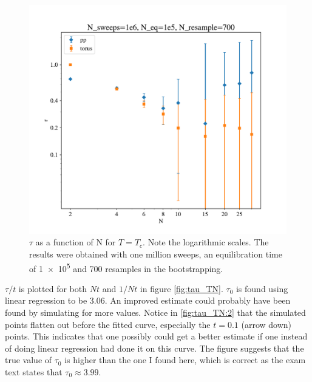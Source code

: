 \documentclass[12pt, a4paper]{article}
\begin{document}
\begin{figure}[H]
  \centering
  \includegraphics[width=.75\textwidth]{media/tau_N}
  \caption{$\tau$ as a function of N for $T=T_c$.
    Note the logarithmic scales.
    The results were obtained with one million sweeps, an equilibration time of \num{1e5} and 700 resamples in the bootstrapping.
    \label{fig:tau_N}}
\end{figure}

$\tau/t$ is plotted for both $Nt$ and $1/Nt$ in figure \ref{fig:tau_TN}.
$\tau_0$ is found using linear regression to be 3.06.
An improved estimate could probably have been found by simulating for more values.
Notice in \ref{fig:tau_TN:2} that the simulated points flatten out before the fitted curve, especially the $t=0.1$ (arrow down) points.
This indicates that one possibly could get a better estimate if one instead of doing linear regression had done it on this curve.
The figure suggests that the true value of $\tau_0$ is higher than the one I found here, which is correct as the exam text states that $\tau_0\approx 3.99$.
\end{document}
